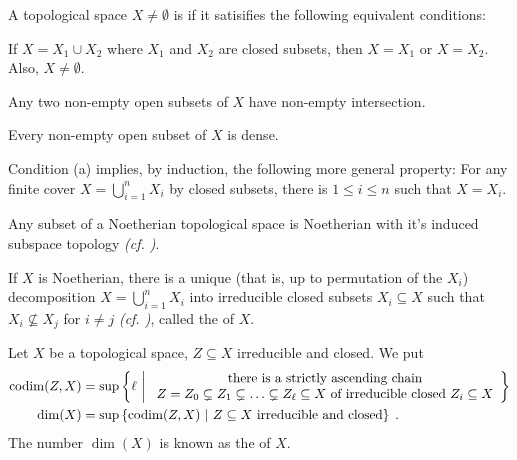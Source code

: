 \documentclass[a4paper,parskip=half,numbers=enddot, DIV=12]{scrreprt}
\begin{document}
\begin{defi}
	A topological space $X\not=\emptyset$ is  if it satisifies the following equivalent conditions:
	\begin{alphanumerate}
		\item If $X = X_1\cup X_2$ where $X_1$ and $X_2$ are closed subsets, then $X=X_1$ or $X=X_2$. Also, $X\neq\emptyset$.
		\item Any two non-empty open subsets of $X$ have non-empty intersection.
		\item Every non-empty open subset of $X$ is dense.
	\end{alphanumerate}
\end{defi}
Condition (a) implies, by induction, the following more general property: 
For any finite cover $X= \bigcup_{i=1}^n X_i$ by closed subsets, there is $1\leq i\leq n$ such that $X=X_i$.
\begin{prop}
	\begin{alphanumerate}
		\item 
		Any subset of a Noetherian topological space is Noetherian with it's induced subspace topology \emph{(cf. \cite[Remark~2.2.1]{alg1})}. 
		\item 
		If $X$ is Noetherian, there is a unique (that is, up to permutation of the $X_i$) decomposition $X = \bigcup_{i=1}^n X_i$ into irreducible closed subsets $X_i\subseteq X$ such that $X_i\not\subseteq X_j$ for $i\neq j$ \emph{(cf. \cite[Proposition~2.1.1]{alg1})}, called the  of $X$.
	\end{alphanumerate}
	
\end{prop}
\begin{defi}
	Let $X$ be a topological space, $Z\subseteq X$ irreducible and closed. We put 
	\begin{align*}
	\operatorname{codim}(Z,X) &= \sup\left\{\ell\ \middle|\  
	\begin{array}{c}
	\text{there is a strictly ascending chain}\\
	Z=Z_0 \subsetneq Z_1\subsetneq \ldots \subsetneq Z_\ell\subseteq X\text{ of irreducible closed }Z_i\subseteq X
	\end{array}\right\}\\
	\dim(X) &= \sup\left\{\operatorname{codim}(Z,X)\ \middle|\  Z\subseteq X \text{ irreducible and closed}\right\}\;.
	\end{align*}
	The number $\dim(X)$ is known as the  of $X$.
\end{defi}
\end{document}
